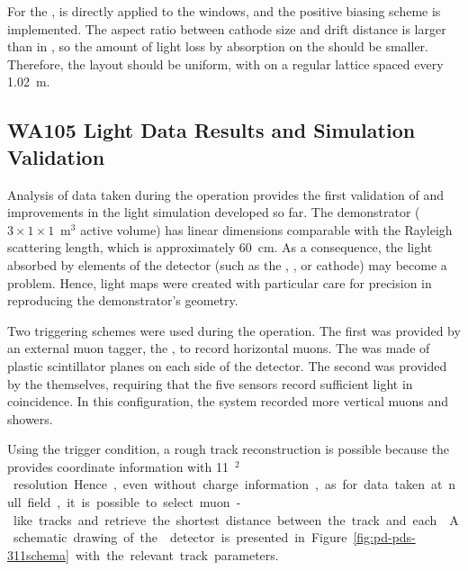 For the  ,  is directly applied to the  windows, and the positive biasing scheme is implemented. The aspect ratio between cathode size and drift distance is larger than in , so the amount of light loss by absorption on the  should be smaller. Therefore, the   layout should be uniform, with  on a regular lattice spaced every \SI{1.02}{m}. 


\subsection{WA105 Light Data Results and Simulation Validation}

Analysis of data taken during the  operation provides the first validation of and improvements in the light simulation developed so far. 
The demonstrator ($3\times1\times1$~m$^3$ active volume) has linear dimensions comparable with the Rayleigh scattering length, which is approximately \SI{60}{\cm}. 
As a consequence, the light absorbed by elements of the detector (such as the , , or cathode) may become a problem.
Hence, light maps were created with particular care for precision in reproducing the demonstrator's geometry.

Two triggering schemes were used during the  operation.
The first was provided by an external muon tagger, the , to record horizontal muons. The  was made of plastic scintillator planes on each side of the detector.
The second was provided by the  themselves, requiring that the five sensors record sufficient light in coincidence. In this configuration, the system recorded more vertical muons and showers.

Using the  trigger condition, a rough track reconstruction is possible because the  provides coordinate information with \SI{11}{\cm$^2$} resolution. Hence, even without charge information, as for data taken at null field, it is possible to select muon-like tracks and retrieve the shortest distance between the track and each . A schematic drawing of the  detector is presented in Figure~\ref{fig:pd-pds-311schema} with the relevant track parameters.

